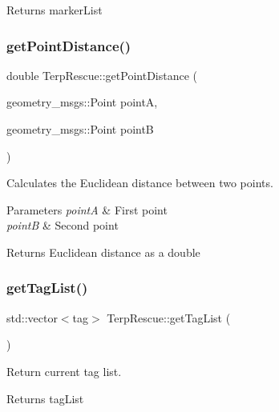 \begin{DoxyReturn}{Returns}
marker\+List 
\end{DoxyReturn}
\mbox{\label{classTerpRescue_aa0f293d50d30f9e3b0fab412e3392ffd}} 
\subsubsection{\texorpdfstring{get\+Point\+Distance()}{getPointDistance()}}
{\footnotesize\ttfamily double Terp\+Rescue\+::get\+Point\+Distance (\begin{DoxyParamCaption}\item[{geometry\+\_\+msgs\+::\+Point}]{pointA,  }\item[{geometry\+\_\+msgs\+::\+Point}]{pointB }\end{DoxyParamCaption})}



Calculates the Euclidean distance between two points. 


\begin{DoxyParams}{Parameters}
{\em pointA} & First point \\
\hline
{\em pointB} & Second point \\
\hline
\end{DoxyParams}
\begin{DoxyReturn}{Returns}
Euclidean distance as a double 
\end{DoxyReturn}
\mbox{\label{classTerpRescue_ae1d56c14d74089c5e779cf94ed20adf9}} 
\subsubsection{\texorpdfstring{get\+Tag\+List()}{getTagList()}}
{\footnotesize\ttfamily std\+::vector$<$tag$>$ Terp\+Rescue\+::get\+Tag\+List (\begin{DoxyParamCaption}{ }\end{DoxyParamCaption})}



Return current tag list. 

\begin{DoxyReturn}{Returns}
tag\+List 
\end{DoxyReturn}
\mbox{\label{classTerpRescue_a390972c728cc524757421808e37f3bc2}} 
